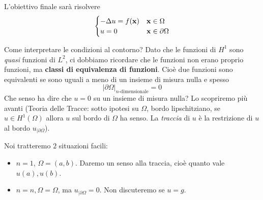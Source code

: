 L'obiettivo finale sarà risolvere
\begin{equation*}
    \begin{cases}
        -\Delta u=f(\mathbf{x}) & \mathbf{x} \in \Omega          \\
        u=0             & \mathbf{x} \in \partial \Omega
    \end{cases}
\end{equation*}
\begin{oss}
    Come interpretare le condizioni al contorno? Dato che le funzioni di $H^{1}$ sono \textit{quasi} funzioni di $L^{2}$, ci dobbiamo ricordare che le funzioni non erano proprio funzioni, ma \textbf{classi di equivalenza di funzioni}. Cioè due funzioni sono equivalenti se sono uguali a meno di un insieme di misura nulla e spesso
    \begin{equation*}
        | \partial \Omega | _{n\text{-dimensionale}} =0
    \end{equation*}
    Che senso ha dire che $u=0$ su un insieme di misura nulla? Lo scopriremo più avanti (Teoria delle Tracce: sotto ipotesi su $\Omega $, bordo lipschitziano, se $u\in H^{1}(\Omega)$ allora $u$ sul bordo di $\Omega $ ha senso. La \textit{traccia} di $u$ è la restrizione di $u$ al bordo $u_{|\partial \Omega }$).
\end{oss}
Noi tratteremo $2$ situazioni facili:
\begin{itemize}
    \item $n=1$, $\Omega =(a,b)$. Daremo un senso alla traccia, cioè quanto vale $u(a) ,u(b)$.
    \item $n=n,\Omega =\Omega $, ma $u_{|\partial \Omega } =0$. Non discuteremo se $u=g$.
\end{itemize}


